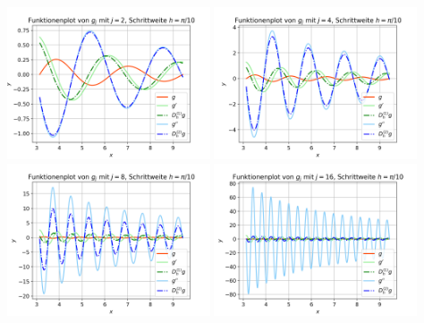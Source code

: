 \documentclass{scrartcl}
\begin{document}
{    \vspace{0.5cm}
    \includegraphics[width=0.45\textwidth]{Grafiken/Funktionenplot_j2_Pi_Zehntel}
    \includegraphics[width=0.45\textwidth]{Grafiken/Funktionenplot_j4_Pi_Zehntel}\\
    \includegraphics[width=0.45\textwidth]{Grafiken/Funktionenplot_j8_Pi_Zehntel}
    \includegraphics[width=0.45\textwidth]{Grafiken/Funktionenplot_j16_Pi_Zehntel}\\
    \vspace{-0.2cm}
    \vspace{0.5cm}
  }
\end{document}
